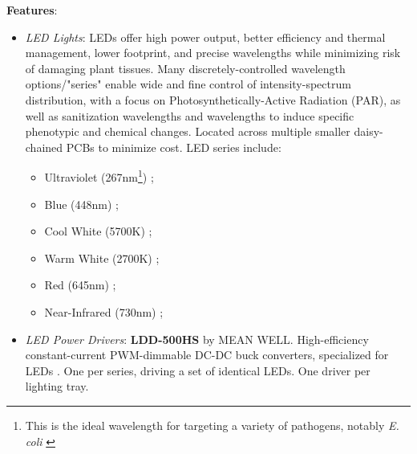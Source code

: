 \textbf{Features}:
\begin{itemize}
    \item \textit{LED Lights}: LEDs offer high power output, better efficiency and thermal management, lower footprint, and precise wavelengths while minimizing risk of damaging plant tissues. Many discretely-controlled wavelength options/"series" enable wide and fine control of intensity-spectrum distribution, with a focus on Photosynthetically-Active Radiation (PAR), as well as sanitization wavelengths and wavelengths to induce specific phenotypic and chemical changes. Located across multiple smaller daisy-chained PCBs to minimize cost. LED series include:
    \begin{itemize}
        \item Ultraviolet (267nm\footnote{This is the ideal wavelength for targeting a variety of pathogens, notably \textit{E. coli} \cite{uvecoli}}) \cite{led_uv};
        \item Blue (448nm) \cite{led_xpg3};
        \item Cool White (5700K) \cite{led_xpg3};
        \item Warm White (2700K) \cite{led_xpg3};
        \item Red (645nm) \cite{led_xpg3};
        \item Near-Infrared (730nm) \cite{led_xpe2};
    \end{itemize}
    \item \textit{LED Power Drivers}: \textbf{LDD-500HS} by MEAN WELL. High-efficiency constant-current PWM-dimmable DC-DC buck converters, specialized for LEDs \cite{leddriver}. One per series, driving a set of identical LEDs. One driver per lighting tray.
\end{itemize}